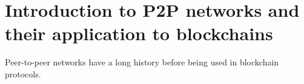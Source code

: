 
\chapter{Introduction to P2P networks and their application to blockchains} %

\label{Chapter02_Intro_P2P} %

Peer-to-peer networks have a long history before being used in blockchain protocols.